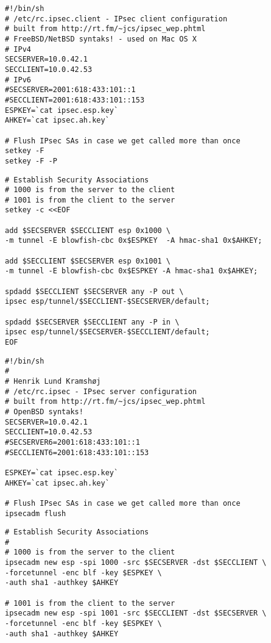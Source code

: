 \documentclass[Screen16to9,17pt]{foils}
\begin{document}

\begin{verbatim}
#!/bin/sh
# /etc/rc.ipsec.client - IPsec client configuration
# built from http://rt.fm/~jcs/ipsec_wep.phtml
# FreeBSD/NetBSD syntaks! - used on Mac OS X
# IPv4
SECSERVER=10.0.42.1
SECCLIENT=10.0.42.53
# IPv6
#SECSERVER=2001:618:433:101::1
#SECCLIENT=2001:618:433:101::153
ESPKEY=`cat ipsec.esp.key`
AHKEY=`cat ipsec.ah.key`

# Flush IPsec SAs in case we get called more than once
setkey -F
setkey -F -P
\end{verbatim}


\begin{verbatim}
# Establish Security Associations
# 1000 is from the server to the client
# 1001 is from the client to the server
setkey -c <<EOF

add $SECSERVER $SECCLIENT esp 0x1000 \
-m tunnel -E blowfish-cbc 0x$ESPKEY  -A hmac-sha1 0x$AHKEY;

add $SECCLIENT $SECSERVER esp 0x1001 \
-m tunnel -E blowfish-cbc 0x$ESPKEY -A hmac-sha1 0x$AHKEY;

spdadd $SECCLIENT $SECSERVER any -P out \
ipsec esp/tunnel/$SECCLIENT-$SECSERVER/default;

spdadd $SECSERVER $SECCLIENT any -P in \
ipsec esp/tunnel/$SECSERVER-$SECCLIENT/default;
EOF
\end{verbatim}


\begin{verbatim}
#!/bin/sh
#
# Henrik Lund Kramshøj
# /etc/rc.ipsec - IPsec server configuration
# built from http://rt.fm/~jcs/ipsec_wep.phtml
# OpenBSD syntaks!
SECSERVER=10.0.42.1
SECCLIENT=10.0.42.53
#SECSERVER6=2001:618:433:101::1
#SECCLIENT6=2001:618:433:101::153

ESPKEY=`cat ipsec.esp.key`
AHKEY=`cat ipsec.ah.key`

# Flush IPsec SAs in case we get called more than once
ipsecadm flush
\end{verbatim}



\begin{verbatim}
# Establish Security Associations
#
# 1000 is from the server to the client
ipsecadm new esp -spi 1000 -src $SECSERVER -dst $SECCLIENT \
-forcetunnel -enc blf -key $ESPKEY \
-auth sha1 -authkey $AHKEY

# 1001 is from the client to the server
ipsecadm new esp -spi 1001 -src $SECCLIENT -dst $SECSERVER \
-forcetunnel -enc blf -key $ESPKEY \
-auth sha1 -authkey $AHKEY
\end{verbatim}
\end{document}
